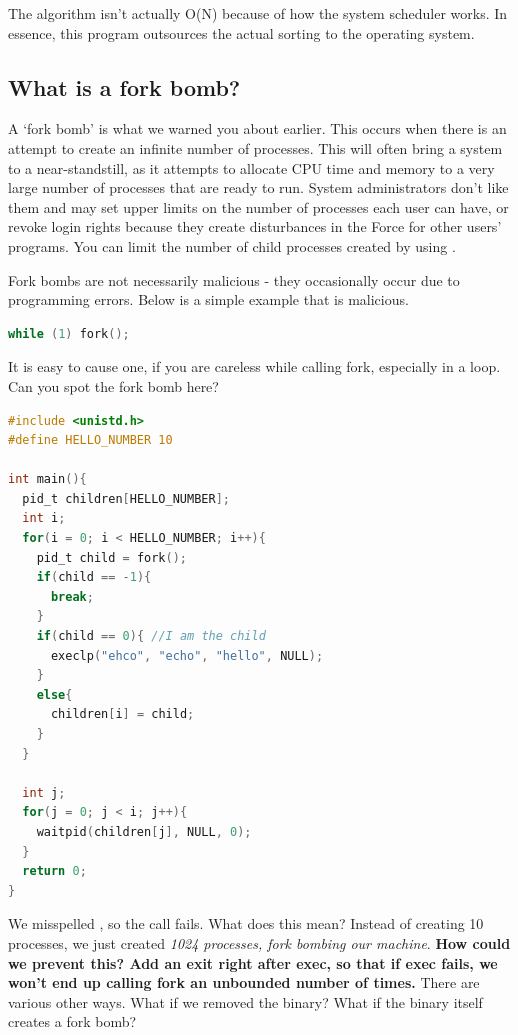 The algorithm isn't actually O(N) because of how the system scheduler works.
In essence, this program outsources the actual sorting to the operating system.

\subsection{What is a fork bomb?}

A `fork bomb' is what we warned you about earlier.
This occurs when there is an attempt to create an infinite number of processes.
This will often bring a system to a near-standstill, as it attempts to allocate CPU time and memory to a very large number of processes that are ready to run.
System administrators don't like them and may set upper limits on the number of processes each user can have, or revoke login rights because they create disturbances in the Force for other users' programs.
You can limit the number of child processes created by using .

Fork bombs are not necessarily malicious - they occasionally occur due to programming errors.
Below is a simple example that is malicious.

\begin{lstlisting}[language=C]
while (1) fork();
\end{lstlisting}

It is easy to cause one, if you are careless while calling fork, especially in a loop.
Can you spot the fork bomb here?

\begin{lstlisting}[language=C]
#include <unistd.h>
#define HELLO_NUMBER 10

int main(){
  pid_t children[HELLO_NUMBER];
  int i;
  for(i = 0; i < HELLO_NUMBER; i++){
    pid_t child = fork();
    if(child == -1){
      break;
    }
    if(child == 0){ //I am the child
      execlp("ehco", "echo", "hello", NULL);
    }
    else{
      children[i] = child;
    }
  }

  int j;
  for(j = 0; j < i; j++){
    waitpid(children[j], NULL, 0);
  }
  return 0;
}
\end{lstlisting}

We misspelled , so the  call fails.
What does this mean? Instead of creating 10 processes, we just created \emph{1024 processes, fork bombing our machine}. \textbf{How could we prevent this? Add an exit right after exec, so that if exec fails, we won't end up calling fork an unbounded number of times.}
There are various other ways. What if we removed the  binary? What if the binary itself creates a fork bomb?

